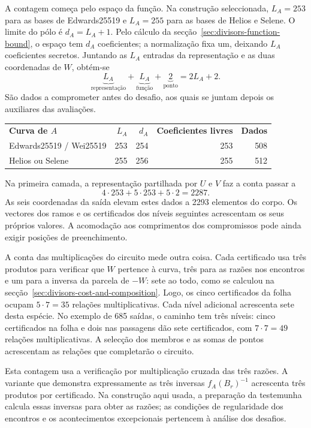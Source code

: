 A contagem começa pelo espaço da função. Na construção
seleccionada, \(L_A=253\) para as bases de Edwards25519
e \(L_A=255\) para as bases de Helios e Selene. O limite
do pólo é \(d_A=L_A+1\). Pelo cálculo da
secção~\ref{sec:divisors-function-bound}, o espaço tem
\(d_A\) coeficientes; a normalização fixa um, deixando
\(L_A\) coeficientes secretos. Juntando as \(L_A\) entradas
da representação e as duas coordenadas de \(W\), obtém-se
\[
 \underbrace{L_A}_{\text{representação}}
 +\underbrace{L_A}_{\text{função}}
 +\underbrace{2}_{\text{ponto}}
 =2L_A+2.
\]
São dados a comprometer antes do desafio, aos quais se
juntam depois os auxiliares das avaliações.
\begin{center}
\begin{tabular}{lrrrr}
\textbf{Curva de \(A\)} & \(L_A\) & \(d_A\) &
 \textbf{Coeficientes livres} & \textbf{Dados}\\[1mm]
Edwards25519 / Wei25519 & 253 & 254 & 253 & 508\\
Helios ou Selene & 255 & 256 & 255 & 512
\end{tabular}
\end{center}
Na primeira camada, a representação partilhada por \(U\)
e \(V\) faz a conta passar a
\[
 4\cdot253+5\cdot253+5\cdot2=2287.
\]
As seis coordenadas da saída elevam estes dados a 2293
elementos do corpo. Os vectores dos ramos e os certificados
dos níveis seguintes acrescentam os seus próprios valores.
A acomodação aos comprimentos dos compromissos pode ainda
exigir posições de preenchimento.

A conta das multiplicações do circuito mede outra coisa.
Cada certificado usa três produtos para verificar que
\(W\) pertence à curva, três para as razões nos encontros
e um para a inversa da parcela de \(-W\): sete ao todo,
como se calculou na secção~\ref{sec:divisors-cost-and-composition}.
Logo, os cinco certificados da folha ocupam
\(5\cdot7=35\) relações multiplicativas. Cada nível
adicional acrescenta sete desta espécie. No exemplo de
685 saídas, o caminho tem três níveis: cinco certificados
na folha e dois nas passagens dão sete certificados, com
\(7\cdot7=49\) relações multiplicativas. A selecção dos
membros e as somas de pontos acrescentam as relações que
completarão o circuito.

Esta contagem usa a verificação por multiplicação cruzada
das três razões. A variante que demonstra expressamente
as três inversas \(f_A(B_r)^{-1}\) acrescenta três produtos
por certificado. Na construção aqui usada, a preparação da
testemunha calcula essas inversas para obter as razões; as
condições de regularidade dos encontros e os acontecimentos
excepcionais pertencem à análise dos desafios.

